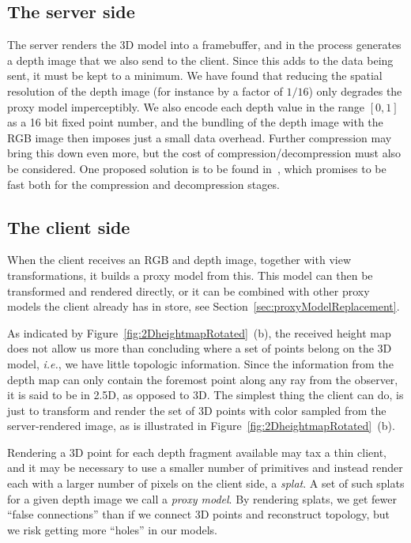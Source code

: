 \documentclass[10pt,conference,compsocconf]{IEEEtran}
\newcommand{\ie}{{\em i.e.}}
\begin{document}
\subsection{The server side}

The server renders the 3D model into a framebuffer, and in the process generates
a depth image that we also send to the client.
Since this adds to the data being sent, it must be kept to a minimum. We have
found that reducing the spatial resolution of the depth image (for instance by a
factor of $1/16$) only degrades the proxy model imperceptibly.  We also encode
each depth value in the range $[0, 1]$ as a 16 bit fixed point number, and the
bundling of the depth image with the RGB image then imposes just a small data
overhead.
Further compression may bring this down even more, but the cost of
compression/decompression must also be
considered.
One proposed solution is to be found in~\cite{DBLP:journals/tvcg/Lindstrom14},
which promises to be fast both for the compression and decompression stages.


\subsection{The client side}
\label{sec:client}

When the client receives an RGB and depth image, together with view
transformations, it builds a proxy model from this. This model can then be
transformed and rendered directly, or it can be combined with other proxy models
the client already has in store, see Section~\ref{sec:proxyModelReplacement}.

As indicated by Figure~\ref{fig:2DheightmapRotated}~(b), the received height map
does not allow us more than concluding where a set of points belong on the 3D
model, \ie, we have little topologic information. Since the information from the
depth map can only contain the foremost point along any ray from the observer,
it is said to be in 2.5D, as opposed to 3D.  The simplest thing the client can
do, is just to transform and render the set of 3D points with color sampled from
the server-rendered image, as is illustrated in
Figure~\ref{fig:2DheightmapRotated}~(b).

Rendering a 3D point for each depth fragment available may tax a thin client,
and it may be necessary to use a smaller number of primitives and instead render
each with a larger number of pixels on the client side, a {\em splat}.  A set of
such splats for a given depth image we call a {\em proxy model}. By rendering
splats, we get fewer ``false connections'' than if we connect 3D points and
reconstruct topology, but we risk getting more ``holes'' in our models.
\end{document}
